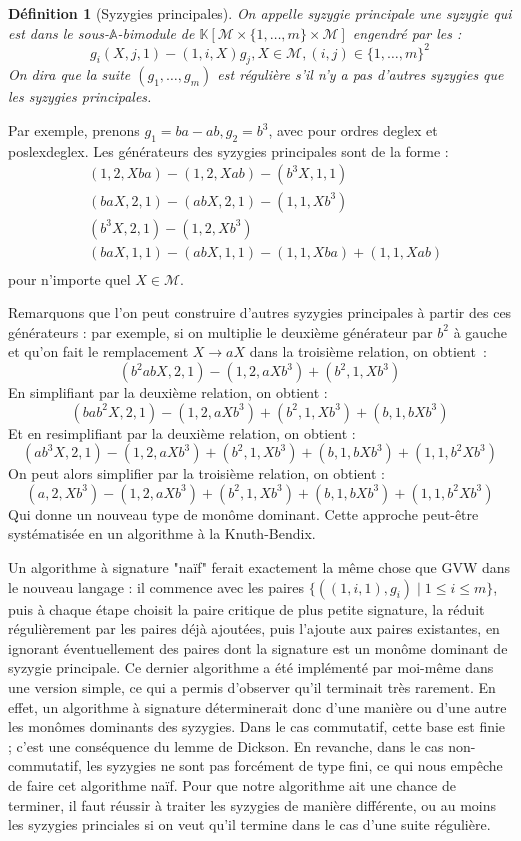 \documentclass{article}
\newtheorem*{dfn}{Définition}
\newcommand{\K}{\mathbb{K}}
\newcommand{\A}{\mathbb{A}}
\newcommand{\M}{\mathcal{M}}
\newcommand{\CR}{\K[\M\times\{1, \dots, m\}\times\M]}
\begin{document}
\begin{dfn}[Syzygies principales]
	On appelle syzygie principale une syzygie qui est dans le sous-$\A$-bimodule de $\CR$ engendré par les :
	$$g_i(X, j, 1) - (1, i, X)g_j, X \in \M, (i, j) \in \{1, \dots, m\}^2$$
	On dira que la suite $(g_1, \dots, g_m)$ est régulière s'il n'y a pas d'autres syzygies que les syzygies principales.
	
\end{dfn}

Par exemple, prenons $g_1 = ba - ab, g_2 = b^3$, avec pour ordres deglex et poslexdeglex.
Les générateurs des syzygies principales sont de la forme :
\begin{align*}
& (1, 2, Xba) - (1, 2, Xab) - (b^3X, 1, 1) \\
& (baX, 2, 1) - (abX, 2, 1) - (1, 1, Xb^3) \\
& (b^3X, 2, 1) - (1, 2, Xb^3) \\
& (baX, 1, 1) - (abX, 1, 1) - (1, 1, Xba) + (1, 1, Xab) \\
\end{align*}
pour n'importe quel $X \in \M$.

Remarquons que l'on peut construire d'autres syzygies principales à partir des ces générateurs :
par exemple, si on multiplie le deuxième générateur par $b^2$ à gauche et qu'on fait le remplacement $X \rightarrow aX$ dans la troisième relation, on obtient~:
$$(b^2abX, 2, 1) - (1, 2, aXb^3) + (b^2, 1, Xb^3) $$
En simplifiant par la deuxième relation, on obtient :
$$(bab^2X, 2, 1) - (1, 2, aXb^3) + (b^2, 1, Xb^3) + (b, 1, bXb^3)$$
Et en resimplifiant par la deuxième relation, on obtient :
$$(ab^3X, 2, 1) - (1, 2, aXb^3) + (b^2, 1, Xb^3) + (b, 1, bXb^3) + (1, 1, b^2Xb^3)$$
On peut alors simplifier par la troisième relation, on obtient :
$$(a, 2, Xb^3) - (1, 2, aXb^3) + (b^2, 1, Xb^3) + (b, 1, bXb^3) + (1, 1, b^2Xb^3)$$
Qui donne un nouveau type de monôme dominant. Cette approche peut-être systématisée en un algorithme à la Knuth-Bendix.

Un algorithme à signature "naïf" ferait exactement la même chose que GVW dans le nouveau langage :
il commence avec les paires $\{((1, i, 1), g_i) \;|\; 1 \leq i \leq m\}$, puis à chaque étape choisit la paire critique de plus petite signature, la réduit régulièrement par les paires déjà ajoutées, puis l'ajoute aux paires existantes, en ignorant éventuellement des paires dont la signature est un monôme dominant de syzygie principale. Ce dernier algorithme a été implémenté par moi-même dans une version simple, ce qui a permis d'observer qu'il terminait très rarement.
En effet, un algorithme à signature déterminerait donc d'une manière ou d'une autre les monômes dominants des syzygies. Dans le cas commutatif, cette base est finie ; c'est une conséquence du lemme de Dickson.
En revanche, dans le cas non-commutatif, les syzygies ne sont pas forcément de type fini, ce qui nous empêche de faire cet algorithme naïf. Pour que notre algorithme ait une chance de terminer, il faut réussir à traiter les syzygies de manière différente, ou au moins les syzygies princiales si on veut qu'il termine dans le cas d'une suite régulière.
\end{document}
